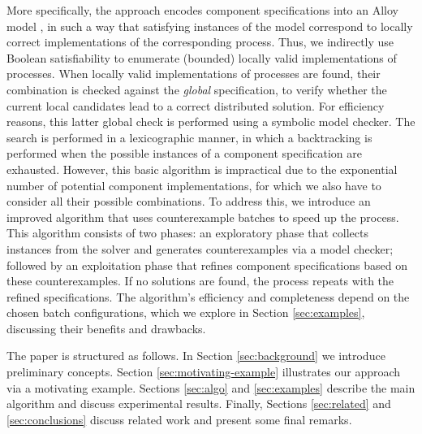 More specifically,  the approach encodes component specifications into an Alloy model \cite{AlloyBook}, in such a way that satisfying instances of the model correspond to locally correct implementations of the corresponding process. Thus,  we indirectly use Boolean satisfiability to enumerate (bounded) locally valid implementations of processes. When locally valid implementations of processes are found, their combination is checked against the \emph{global} specification, to verify whether the current local candidates lead to a correct distributed solution. For efficiency reasons, this latter global check is performed using a symbolic model checker. The search is performed in a lexicographic manner,  in which a backtracking is performed when the possible instances of a component specification are exhausted.
 However,  this basic algorithm is impractical  due to the exponential  number of potential component implementations,  for which we also have to consider all their possible combinations. 
 To address this, we introduce an improved algorithm that uses counterexample batches to speed up the process.  This algorithm  consists of two phases: an exploratory phase that collects instances from the solver and generates counterexamples via a model checker; followed by an exploitation phase that refines component specifications based on these counterexamples.  If no solutions are found, the process repeats with the refined specifications.  The algorithm's efficiency and completeness depend on the chosen batch configurations, which we explore in Section \ref{sec:examples}, discussing their benefits and drawbacks.
 
The paper is structured as follows.  In Section \ref{sec:background} we introduce preliminary concepts. Section \ref{sec:motivating-example} illustrates our approach via a motivating example.  Sections \ref{sec:algo} and \ref{sec:examples} describe the main algorithm and discuss experimental results. Finally,  Sections \ref{sec:related} and \ref{sec:conclusions} discuss related work and present some final remarks.




